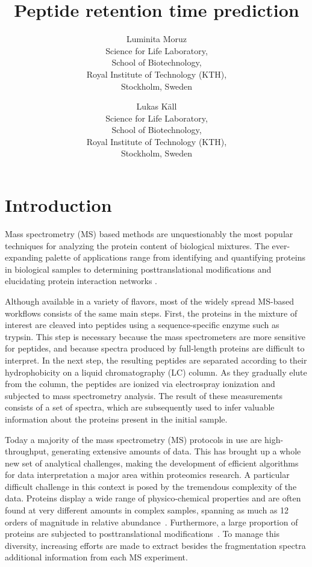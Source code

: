 \documentclass[a4paper]{article}
\title{Peptide retention time prediction}
\author{
Luminita Moruz\\
Science for Life Laboratory,\\
School of Biotechnology,\\
Royal Institute of Technology (KTH),\\
Stockholm, Sweden
\and
Lukas K\"{a}ll\\
Science for Life Laboratory,\\
School of Biotechnology,\\
Royal Institute of Technology (KTH),\\
Stockholm, Sweden}
\begin{document}
\maketitle

\setcounter{secnumdepth}{2} %
\setcounter{tocdepth}{2}    %
\tableofcontents            %

\setlength{\parskip}{0.15cm}

\section{Introduction}

Mass spectrometry (MS) based methods are unquestionably the most
popular techniques for analyzing the protein content of biological
mixtures.  The ever-expanding palette of applications range from
identifying and quantifying proteins in biological samples
\cite{Geiger2012} to determining posttranslational modifications
\cite{Huttlin2010} and elucidating protein interaction networks
\cite{Gavin2011}.

Although available in a variety of flavors, most of the widely spread
MS-based workflows consists of the same main steps. First, the
proteins in the mixture of interest are cleaved into peptides using a
sequence-specific enzyme such as trypsin. This step is necessary
because the mass spectrometers are more sensitive for peptides, and
because spectra produced by full-length proteins are difficult to
interpret. In the next step, the resulting peptides are separated
according to their hydrophobicity on a liquid chromatography (LC)
column. As they gradually elute from the column, the peptides are
ionized via electrospray ionization and subjected to mass spectrometry
analysis. The result of these measurements consists of a set of
spectra, which are subsequently used to infer valuable information
about the proteins present in the initial sample.

Today a majority of the mass spectrometry (MS) protocols in use are
high-throughput, generating extensive amounts of data. This has
brought up a whole new set of analytical challenges, making the
development of efficient algorithms for data interpretation a major
area within proteomics research. A particular difficult challenge in
this context is posed by the tremendous complexity of the data.
Proteins display a wide range of physico-chemical properties and are
often found at very different amounts in complex samples, spanning as
much as 12 orders of magnitude in relative abundance~\cite{Angel2012}.
Furthermore, a large proportion of proteins are subjected to
posttranslational modifications~\cite{Lemeer2009}. To manage this
diversity, increasing efforts are made to extract besides the
fragmentation spectra additional information from each MS experiment.
\end{document}
